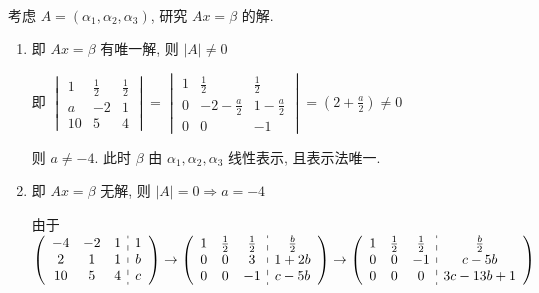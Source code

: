      \paragraph{} %
         考虑 \( A = (\alpha_{1}, \alpha_{2}, \alpha_{3}) \), 研究 \( Ax = \beta \) 的解.
         \begin{enumerate}
             \item %
                   即 \( Ax = \beta \) 有唯一解, 则 \( |A| \neq 0 \)

                   即 \( \begin{vmatrix}
                       1  & \frac{1}{2} & \frac{1}{2} \\
                       a  & -2          & 1           \\
                       10 & 5           & 4
                   \end{vmatrix} = \begin{vmatrix}
                       1 & \frac{1}{2}    & \frac{1}{2}   \\
                       0 & -2-\frac{a}{2} & 1-\frac{a}{2} \\
                       0 & 0              & -1
                   \end{vmatrix} = (2+\frac{a}{2}) \neq 0 \)

                   则 \( a \neq -4 \). 此时 \( \beta \) 由 \( \alpha_{1}, \alpha_{2}, \alpha_{3} \) 线性表示, 且表示法唯一.
             \item %
                   即 \( Ax = \beta \) 无解, 则 \( |A| = 0 \Rightarrow a = -4 \)

                   由于 \( \left(\begin{array}{ccc:c}
                           -4 & -2 & 1 & 1 \\
                           2  & 1  & 1 & b \\
                           10 & 5  & 4 & c
                       \end{array}\right)
                   \to
                   \left(\begin{array}{ccc:c}
                           1 & \frac{1}{2} & \frac{1}{2} & \frac{b}{2} \\
                           0 & 0           & 3           & 1+2b        \\
                           0 & 0           & -1          & c-5b
                       \end{array}\right)
                   \to
                   \left(\begin{array}{ccc:c}
                           1 & \frac{1}{2} & \frac{1}{2} & \frac{b}{2} \\
                           0 & 0           & -1          & c-5b        \\
                           0 & 0           & 0           & 3c-13b+1
                       \end{array}\right) \)


\end{enumerate}
